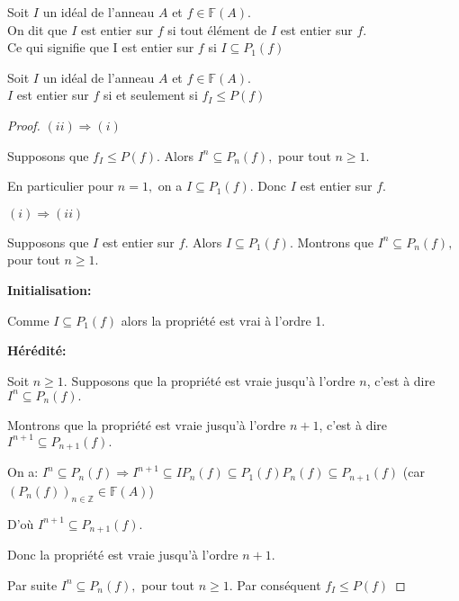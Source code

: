 \begin{madefinition}
	Soit $I$ un idéal de l'anneau $A$ et $f \in \mathbb{F}(A)$. \\
	On dit que $I$ est entier sur $f$ si tout élément de $I$ est entier sur $f$. \\
	Ce qui signifie que I est entier sur $f$ si $I \subseteq P_1(f)$
\end{madefinition}
\begin{maconsequence}
	Soit $I$ un idéal de l'anneau $A$ et $f \in \mathbb{F}(A)$. \\
	$I$ est entier sur $f$ si et seulement si $f_I \leqslant P(f)$
\end{maconsequence}
\begin{proof}
	$(ii)\Longrightarrow (i)$
	
	Supposons que $f_{I}\leq P(f).$ Alors $I^{n}\subseteq P_{n}(f),$ pour tout $n\geq 1.$
	
	En particulier pour $n=1,$ on a $I\subseteq P_{1}(f).$ Donc $I$ est entier sur $f.$
	
	$(i)\Longrightarrow (ii)$
	
	Supposons que $I$ est entier sur $f.$ Alors $I\subseteq P_{1}(f).$ Montrons que $I^{n}\subseteq P_{n}(f),$ pour tout $n\geq 1.$
	
	\textbf{Initialisation:}
	
	Comme $I\subseteq P_{1}(f)$ alors la propriété est vrai à l'ordre 1.
	
	\textbf{Hérédité:}
	
	Soit $n\geq 1.$ Supposons que la propriété est vraie jusqu'à l'ordre $n$, c'est à dire $I^{n}\subseteq P_{n}(f).$
	
	Montrons que la propriété est vraie jusqu'à l'ordre $n+1$, c'est à dire $I^{n+1}\subseteq P_{n+1}(f).$
	
	On a: $I^{n}\subseteq P_{n}(f)\Longrightarrow I^{n+1}\subseteq
	IP_{n}(f)\subseteq P_{1}(f)P_{n}(f)\subseteq P_{n+1}(f)$ (car $
	(P_{n}(f))_{n\in \mathbb{Z}}\in \mathbb{F}(A)$)
	
	D'où $I^{n+1}\subseteq P_{n+1}(f).$
	
	Donc la propriété est vraie jusqu'à l'ordre $n+1.$
	
	Par suite $I^{n}\subseteq P_{n}(f),$ pour tout $n\geq 1.$ Par conséquent $f_{I}\leq P(f)$
\end{proof}

